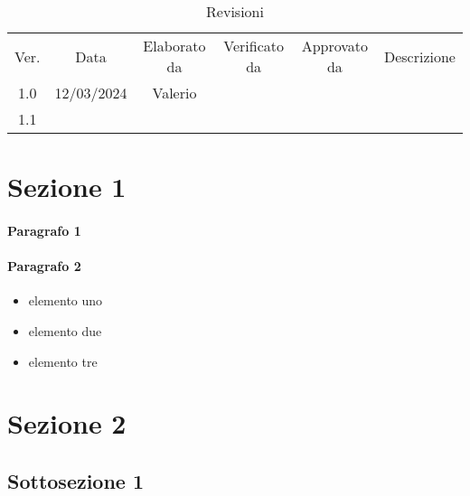 \documentclass{article} %
\begin{document}


\newpage



\tableofcontents


\begin{table}[!b]
    \caption {Revisioni} \label{tab:title} 
    \begin{center}
        \begin{tabular}{ c c c c c c } 
         \hline
         Ver. & Data & Elaborato da & Verificato da & Approvato da & Descrizione \\ 
         1.0 & 12/03/2024 & Valerio  \\ 
         1.1 & \\
         \hline
        \end{tabular}
    \end{center}
\end{table}

\newpage


\section{Sezione 1}

\paragraph{Paragrafo 1}

\paragraph{Paragrafo 2} 
\begin{itemize}
    \item elemento uno
    \item elemento due 
    \item elemento tre
\end{itemize}



\section{Sezione 2}
\subsection{Sottosezione 1}
\end{document}
